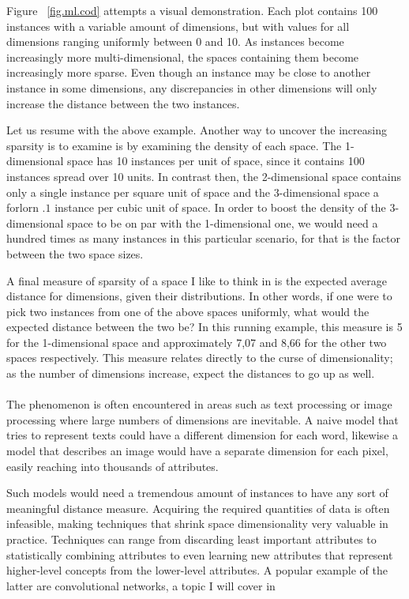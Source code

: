 Figure ~\ref{fig.ml.cod} attempts a visual demonstration.
Each plot contains 100 instances with a variable amount of dimensions,
but with values for all dimensions ranging uniformly between 0 and 10.
As instances become increasingly more multi-dimensional, %
the spaces containing them become increasingly more sparse.
Even though an instance may be close to another instance
in some dimensions,
any discrepancies in other dimensions
will only increase the distance between the two instances.

Let us resume with the above example.
Another way to uncover the increasing sparsity is to examine
is by examining the density of each space.
The 1-dimensional space has 10 instances per unit of space,
since it contains 100 instances spread over 10 units.
In contrast then, the 2-dimensional space contains
only a single instance per square unit of space
and the 3-dimensional space a forlorn $.1$ instance
per cubic unit of space.
In order to boost the density of the 3-dimensional space
to be on par with the 1-dimensional one,
we would need a hundred times as many instances
in this particular scenario,
for that is the factor between the two space sizes.

A final measure of sparsity of a space I like to think in
is the expected average distance for dimensions,
given their distributions.
In other words,
if one were to pick two instances from one of the above spaces uniformly,
what would the expected distance between the two be?
In this running example, %
this measure is 5 for the 1-dimensional space
and approximately 7,07 and 8,66 for the other
two spaces respectively.
This measure relates directly to the curse of dimensionality;
as the number of dimensions increase,
expect the distances to go up as well.

\paragraph{}
The phenomenon is often encountered in areas such as
text processing or image processing
where large numbers of dimensions are inevitable.
A naive model that tries to represent texts
could have a different dimension for each word,
likewise a model that describes an image
would have a separate dimension for each pixel,
easily reaching into thousands of attributes.

Such models would need a tremendous amount
of instances to have any sort of meaningful
distance measure.
Acquiring the required quantities of data
is often infeasible,
making techniques that shrink space dimensionality
very valuable in practice.
Techniques can range from discarding
least important attributes to
statistically combining attributes
to even learning new attributes that represent
higher-level concepts
from the lower-level attributes.
A popular example of the latter are
convolutional networks,
a topic I will cover in %

